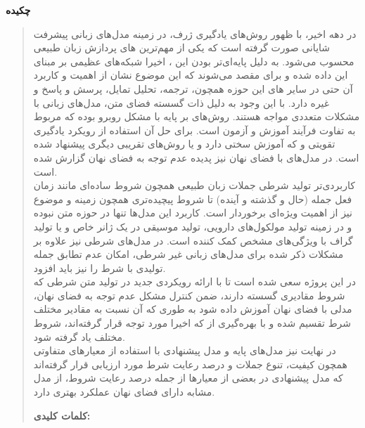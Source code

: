 \thispagestyle{empty}
\centerline{\textbf{\large{چکیده}}}
\begin{quote}
در دهه اخیر، با ظهور روش­‌های یادگیری ژرف، در زمینه مدل‌­های زبانی پیشرفت شایانی صورت گرفته است که یکی از مهم‌ترین \task{}‌های پردازش زبان طبیعی محسوب می‌شود. به دلیل پایه‌ای‌تر بودن این \task{}، اخیرا شبکه‌های عظیمی بر مبنای این \task{}  \pretrain{} داده شده و برای \task{} مقصد \finetuning{} می‌شوند که این موضوع نشان از اهمیت و کاربرد آن حتی در سایر \task{}‌های این حوزه همچون، ترجمه، تحلیل تمایل، پرسش و پاسخ و غیره دارد.
 با این وجود به دلیل ذات گسسته فضای متن، مدل‌های زبانی با مشکلات متعددی مواجه هستند. روش‌های بر پایه \teacherforcing{} با مشکل \expbias{} روبرو بوده که مربوط به تفاوت فرآیند آموزش و آزمون است. برای حل آن استفاده از رويکرد يادگيری تقويتی و \gan{} که آموزش سختی دارد و یا روش‌های تقریبی دیگری پيشنهاد شده است. در مدل‌های با فضای نهان نیز پدیده عدم توجه \decoder{} به فضای نهان گزارش شده است.
\\
\task{}
کاربردی‌­تر تولید شرطی جملات زبان طبیعی همچون شروط ساده­‌ای مانند زمان فعل جمله (حال و گذشته و آینده) تا شروط پیچیده‌­تری همچون زمینه و موضوع نیز از اهمیت ویژه‌ای برخوردار است. کاربرد این مدل‌ها تنها در حوزه متن نبوده و در زمینه تولید مولکول‌های دارویی، تولید موسیقی در یک ژانر خاص و یا تولید گراف با ویژگی‌های مشخص کمک کننده است. در مدل‌های شرطی نیز علاوه بر مشکلات ذکر شده برای مدل‌های زبانی غیر شرطی، امکان عدم تطابق جمله تولیدی با شرط را نیز باید افزود.
\\
در این پروژه سعی شده است تا با ارائه رویکردی جدید در تولید متن شرطی که شروط مقادیری گسسته دارند، ضمن کنترل مشکل عدم توجه به فضای نهان، مدلی \generative{} با فضای نهان آموزش داده شود به طوری که \priordist{} آن نسبت به مقادیر مختلف شرط تقسیم شده و با بهره‌گیری از \normalizingflownets{} که اخیرا مورد توجه قرار گرفته‌اند، \priordist{} شروط مختلف یاد گرفته شود.
\\
در نهایت نیز مدل‌های پایه و مدل پیشنهادی با استفاده از معیار‌های متفاوتی همچون کیفیت، تنوع جملات و درصد رعایت شرط مورد ارزیابی قرار گرفته‌اند که مدل پیشنهادی در بعضی از معیار‌ها از جمله درصد رعایت شروط، از مدل مشابه دارای فضای نهان عملکرد بهتری دارد.

\vskip 1cm
\textbf{کلمات کلیدی:} 
\end{quote}